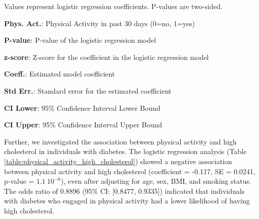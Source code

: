 \documentclass[11pt]{article}
\begin{document}
\begin{table}[h]
\caption{Association between Physical Activity and High BP in Individuals with Diabetes}
\label{table:physical_activity_high_blood_pressure}
\begin{threeparttable}
\renewcommand{\TPTminimum}{\linewidth}
\begin{tablenotes}
\footnotesize
\item Values represent logistic regression coefficients. P-values are two-sided.
\item \textbf{Phys. Act.}: Physical Activity in past 30 days (0=no, 1=yes)
\item \textbf{P-value}: P-value of the logistic regression model
\item \textbf{z-score}: Z-score for the coefficient in the logistic regression model
\item \textbf{Coeff.}: Estimated model coefficient
\item \textbf{Std Err.}: Standard error for the estimated coefficient
\item \textbf{CI Lower}: 95\% Confidence Interval Lower Bound
\item \textbf{CI Upper}: 95\% Confidence Interval Upper Bound
\end{tablenotes}
\end{threeparttable}
\end{table}


Further, we investigated the association between physical activity and high cholesterol in individuals with diabetes. The logistic regression analysis (Table {}\ref{table:physical_activity_high_cholesterol}) showed a negative association between physical activity and high cholesterol (coefficient = -0.117, SE = 0.0241, p-value = $1.1\ 10^{-6}$), even after adjusting for age, sex, BMI, and smoking status. The odds ratio of 0.8896 (95\% CI: [0.8477, 0.9335]) indicated that individuals with diabetes who engaged in physical activity had a lower likelihood of having high cholesterol.
\end{document}
